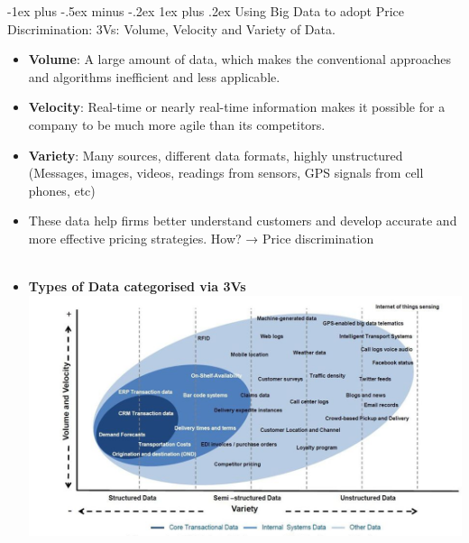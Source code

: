 \documentclass[12pt, landscape]{article}
\makeatletter
\renewcommand{\subsubsection}{\@startsection{subsubsection}{3}{0mm}%
                                {-1ex plus -.5ex minus -.2ex}%
                                {1ex plus .2ex}%
                                {\normalfont\small\bfseries}}
\makeatother
\begin{document}
\begin{multicols*}{3}
\subsubsection{Using Big Data to adopt Price Discrimination:}
3Vs: Volume, Velocity and Variety of Data.
\begin{itemize}
\item \textbf{Volume}: A large amount of data, which makes the conventional approaches and algorithms inefficient and less applicable.
\item \textbf{Velocity}: Real-time or nearly real-time information makes it possible for a company to be much more agile than its competitors.
\item \textbf{Variety}: Many sources, different data formats, highly unstructured (Messages, images, videos, readings from sensors, GPS signals from cell phones, etc)
\item These data help firms better understand customers and develop accurate and more effective pricing strategies. How? → Price discrimination
\\ ~\\
\item \textbf{Types of Data categorised via 3Vs}
\includegraphics[width = \linewidth]{bigData3V}
\end{itemize}



\end{multicols*}
\end{document}
